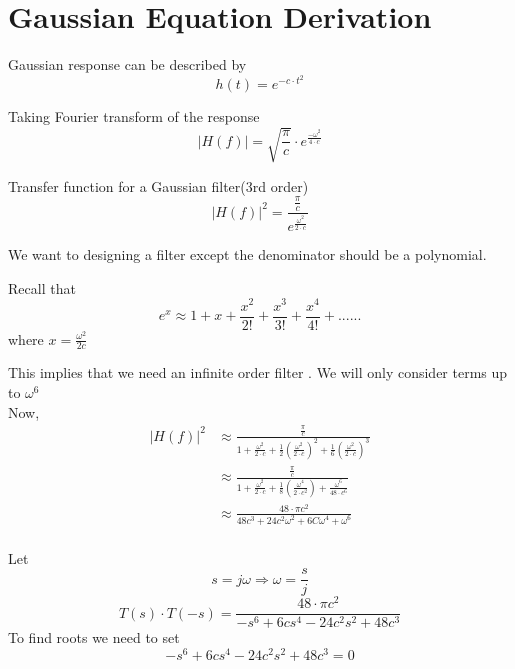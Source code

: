 \documentclass[12pt,oneside,final]{siuethesis}
\theoremstyle{definition}
\begin{document}
\section{Gaussian Equation Derivation}
Gaussian response can be described by
\begin{equation*}
h(t) = e^{-c \cdot t^2}
\end{equation*}

Taking Fourier transform of the response
\begin{equation}
|H(f)| = \sqrt{\frac{\pi}{c}} \cdot e^{\frac{- \omega ^ 2}{4 \cdot c} }
\end{equation}

Transfer function for a Gaussian filter(3rd order)
\begin{equation}
|H(f)|^2 = \frac{{\frac{\pi}{c}}} {e^{\frac{ \omega ^ 2}{2 \cdot c} }} 
\end{equation}

We want to designing a filter except the denominator should be a polynomial.

Recall that
\begin{equation}
e^x \approx 1+x+ \frac{x^2}{2!}+\frac{x^3}{3!}+\frac{x^4}{4!}+......
\end{equation}
where $x= \frac{\omega^2}{2c}$

This implies that we need an infinite order filter . We will only consider terms up to $\omega^6$ \\
Now,
\begin{align*}
|H(f)|^2&\approx \frac{\frac{\pi}{c}}{1+\frac{\omega^2}{2 \cdot c}+ \frac{1}{2} (\frac{\omega^2}{2\cdot c})^2+\frac{1}{6} (\frac{\omega^2}{2\cdot c})^3} \\
&\approx \frac{\frac{\pi}{c}}{1+\frac{\omega^2}{2 \cdot c}+ \frac{1}{8} (\frac{\omega^4}{2\cdot c^2})+ \frac{\omega^6}{48\cdot c^6}} \\
&\approx \frac{48\cdot \pi c^2}{48 c^3+24 c^2 \omega^2+6C\omega^4+\omega^6} \\
\end{align*}

Let
\begin{equation}
s=j\omega \Longrightarrow \omega= \frac{s}{j}
\end{equation}
\begin{equation}
T(s) \cdot T(-s)= \frac{48\cdot \pi c^2}{-s^6+6cs^4-24c^2s^2+48c^3}
\end{equation}
To find roots we need to set
\begin{equation}
-s^6+6cs^4-24c^2s^2+48c^3=0
\end{equation}
\end{document}
